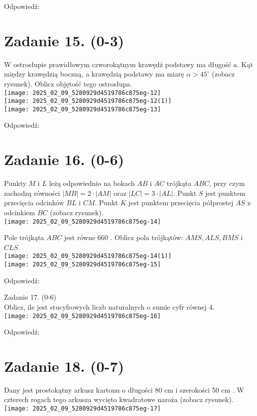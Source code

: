 \documentclass[10pt]{article}
\begin{document}
Odpowiedź:

\section*{Zadanie 15. (0-3)}
W ostrosłupie prawidłowym czworokątnym krawędź podstawy ma długość \(a\). Kąt między krawędzią boczną, a krawędzią podstawy ma miarę \(\alpha>45^{\circ}\) (zobacz rysunek). Oblicz objętość tego ostrosłupa.\\
\texttt{[image: 2025\_02\_09\_5280929d4519786c875eg-12]}\\
\texttt{[image: 2025\_02\_09\_5280929d4519786c875eg-12(1)]}\\
\texttt{[image: 2025\_02\_09\_5280929d4519786c875eg-13]}

Odpowiedź:

\section*{Zadanie 16. (0-6)}
Punkty \(M\) i \(L\) leżą odpowiednio na bokach \(A B\) i \(A C\) trójkąta \(A B C\), przy czym zachodzą równości \(|M B|=2 \cdot|A M|\) oraz \(|L C|=3 \cdot|A L|\). Punkt \(S\) jest punktem przecięcia odcinków \(B L\) i \(C M\). Punkt \(K\) jest punktem przecięcia półprostej \(A S\) z odcinkiem \(B C\) (zobacz rysunek).\\
\texttt{[image: 2025\_02\_09\_5280929d4519786c875eg-14]}

Pole trójkąta \(A B C\) jest równe 660 . Oblicz pola trójkątów: \(A M S, A L S, B M S\) i \(C L S\).\\
\texttt{[image: 2025\_02\_09\_5280929d4519786c875eg-14(1)]}\\
\texttt{[image: 2025\_02\_09\_5280929d4519786c875eg-15]}

Odpowiedź:

Zadanie 17. (0-6)\\
Oblicz, ile jest stucyfrowych liczb naturalnych o sumie cyfr równej 4.\\
\texttt{[image: 2025\_02\_09\_5280929d4519786c875eg-16]}

Odpowiedź:

\section*{Zadanie 18. (0-7)}
Dany jest prostokątny arkusz kartonu o długości 80 cm i szerokości 50 cm . W czterech rogach tego arkusza wycięto kwadratowe naroża (zobacz rysunek).\\
\texttt{[image: 2025\_02\_09\_5280929d4519786c875eg-17]}
\end{document}
